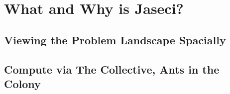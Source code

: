\chapter{What and Why is Jaseci?}
\minitoc
\section{Viewing the Problem Landscape Spacially}
\section{Compute via The Collective, Ants in the Colony}